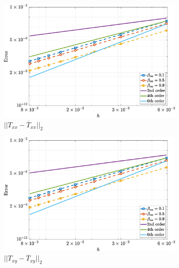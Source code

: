 \documentclass[preprint, 12pt]{elsarticle}
\begin{document}
\begin{figure}[H]
    \centering  
    \begin{subfigure}[b]{.46\textwidth}
        \includegraphics[width=\textwidth]{NormErr_2nd_Re_100_Wi_1_epsilon_0_xi_0_alphaG_0_Dt_1e-06_at_0.05_tipsim_1_MMS_12_Txx.eps}
        \caption{$||T_{xx} - \overline{T}_{xx}||_{2}$}
        \label{error_txx_2nd_Case1_oldorydb}
    \end{subfigure}
    \vspace{0.2cm}
    \qquad
    \begin{subfigure}[b]{.46\textwidth}
        \includegraphics[width=\textwidth]{NormErr_2nd_Re_100_Wi_1_epsilon_0_xi_0_alphaG_0_Dt_1e-06_at_0.05_tipsim_1_MMS_12_Txy.eps}
        \caption{$||T_{xy} - \overline{T}_{xy}||_{2}$}
        \label{error_txy_2nd_Case1_oldorydb}
    \end{subfigure}
    \qquad
    \begin{subfigure}[b]{.46\textwidth}

\end{subfigure}
\end{figure}
\end{document}
